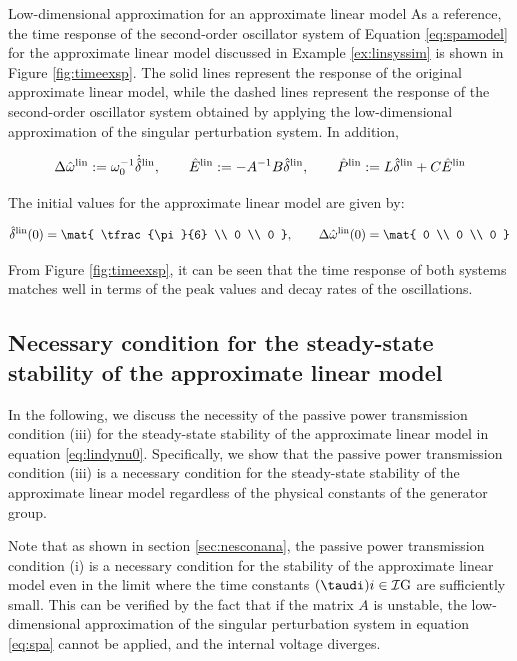\documentclass[graybox, envcountchap]{svmult}
\begin{document}
\begin{example}{Low-dimensional approximation for an approximate linear model}
As a reference, the time response of the second-order oscillator system of
Equation \ref{eq:spamodel} for the approximate linear model discussed in Example
\ref{ex:linsyssim} is shown in Figure \ref{fig:timeexsp}. The solid lines
represent the response of the original approximate linear model, while the
dashed lines represent the response of the second-order oscillator system
obtained by applying the low-dimensional approximation of the singular
perturbation system. In addition,

\[
  \Delta \hat{\omega}^{\rm lin}:=\omega_0^{-1} \dot{\hat{\delta}}^{\rm lin},\qquad
  \hat{E}^{\rm lin}:=-A^{-1}B\hat{\delta}^{\rm lin},\qquad
  \hat{P}^{\rm lin}:= L \hat{\delta}^{\rm lin} + C \hat{E}^{\rm lin}
\]

The initial values for the approximate linear model are given by:

\[
  \hat{\delta}^{\rm lin}(0)
  =
  \mat{
  \tfrac{\pi}{6} \\
  0 \\
  0
  },\qquad
  \Delta \hat{\omega}^{\rm lin}(0)
  =
  \mat{
  0 \\
  0 \\
  0
  }
\]

From Figure \ref{fig:timeexsp}, it can be seen that the time response of both
systems matches well in terms of the peak values and decay rates of the
oscillations.
\end{example}

\subsection{Necessary condition for the steady-state stability of the
approximate linear model \advanced}\label{sec:nesconsta}
In the following, we discuss the necessity of the passive power transmission
condition (iii) for the steady-state stability of the approximate linear model
in equation \ref{eq:lindynu0}.  Specifically, we show that the passive power
transmission condition (iii) is a necessary condition for the steady-state
stability of the approximate linear model regardless of the physical constants
of the generator group.

Note that as shown in section \ref{sec:nesconana}, the passive power
transmission condition (i) is a necessary condition for the stability of the
approximate linear model even in the limit where the time constants $(\taudi){i
\in \mathcal{I}{\rm G}}$ are sufficiently small.  This can be verified by the
fact that if the matrix $A$ is unstable, the low-dimensional approximation of
the singular perturbation system in equation \ref{eq:spa} cannot be applied, and
the internal voltage diverges.
\end{document}
